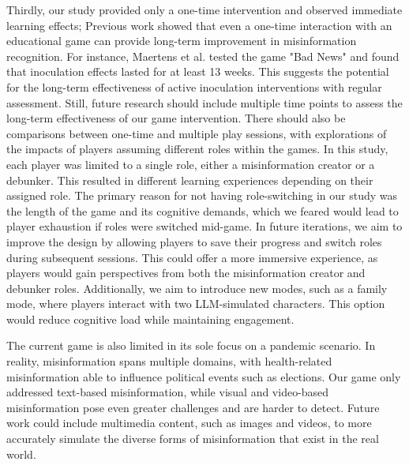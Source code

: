 Thirdly, our study provided only a one-time intervention and observed immediate learning effects; 
Previous work showed that even a one-time interaction with an educational game can provide long-term improvement in misinformation recognition. For instance, Maertens et al. tested the game "Bad News" and found that inoculation effects lasted for at least 13 weeks. This suggests the potential for the long-term effectiveness of active inoculation interventions with regular assessment\cite{maertens2021long}. Still, future research should include multiple time points to assess the long-term effectiveness of our game intervention. There should also be comparisons between one-time and multiple play sessions, with explorations of the impacts of players assuming different roles within the games.
In this study, each player was limited to a single role, either a misinformation creator or a debunker.  This resulted in different learning experiences depending on their assigned role. %
The primary reason for not having role-switching in our study was the length of the game and its cognitive demands, which we feared would lead to player exhaustion if roles were switched mid-game. In future iterations, we aim to improve the design by allowing players to save their progress and switch roles during subsequent sessions. This could offer a more immersive experience, as players would gain perspectives from both the misinformation creator and debunker roles. Additionally, we aim to introduce new modes, such as a family mode, where players interact with two LLM-simulated characters. This option would reduce cognitive load while maintaining engagement. 

The current game is also limited in its sole focus on a pandemic scenario. In reality, misinformation spans multiple domains, with health-related misinformation able to influence political events such as elections. Our game only addressed text-based misinformation, while visual and video-based misinformation pose even greater challenges and are harder to detect. Future work could include multimedia content, such as images and videos, to more accurately simulate the diverse forms of misinformation that exist in the real world.

